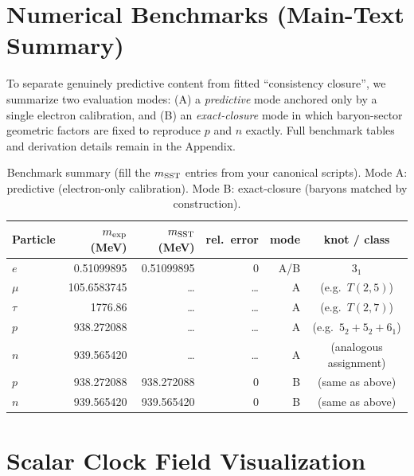 \documentclass[10pt]{article}
\begin{document}

\section{Numerical Benchmarks (Main-Text Summary)}
\label{sec:v075-benchmarks}

To separate genuinely predictive content from fitted ``consistency closure'',
we summarize two evaluation modes:
(A) a \emph{predictive} mode anchored only by a single electron calibration,
and (B) an \emph{exact-closure} mode in which baryon-sector geometric factors
are fixed to reproduce $p$ and $n$ exactly. Full benchmark tables and derivation
details remain in the Appendix.

\begin{table}[h]
\centering
\caption{Benchmark summary (fill the $m_{\rm SST}$ entries from your canonical scripts). Mode A: predictive (electron-only calibration). Mode B: exact-closure (baryons matched by construction).}
\begin{tabular}{lrrrrc}
\hline
Particle & $m_{\rm exp}$ (MeV) & $m_{\rm SST}$ (MeV) & rel.\ error & mode & knot / class \\
\hline
$e$   & 0.51099895 & 0.51099895 & 0 & A/B & $3_1$ \\
$\mu$ & 105.6583745 & \dots & \dots & A & (e.g.\ $T(2,5)$) \\
$\tau$& 1776.86     & \dots & \dots & A & (e.g.\ $T(2,7)$) \\
$p$   & 938.272088  & \dots & \dots & A & (e.g.\ $5_2+5_2+6_1$) \\
$n$   & 939.565420  & \dots & \dots & A & (analogous assignment) \\
\hline
$p$   & 938.272088  & 938.272088 & 0 & B & (same as above) \\
$n$   & 939.565420  & 939.565420 & 0 & B & (same as above) \\
\hline
\end{tabular}
\end{table}


\section{Scalar Clock Field Visualization}
\label{sec:v075-chi-figure}
\end{document}
